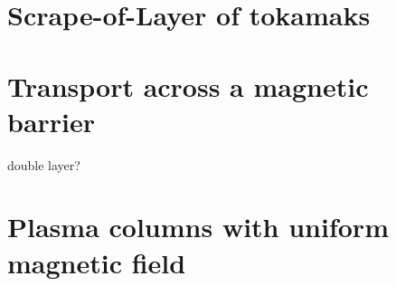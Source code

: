 	\section{Scrape-of-Layer of tokamaks}
	\section{Transport across a magnetic barrier}
		double layer?
	\section{Plasma columns with uniform magnetic field}
	